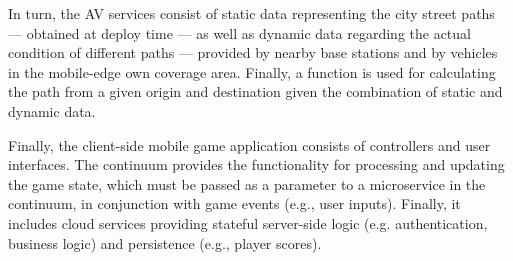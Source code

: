 In turn, the AV services consist of static data representing the city street paths --- obtained at deploy time --- as well as dynamic data regarding the actual condition of different paths --- provided by nearby base stations and by vehicles in the mobile-edge own coverage area. Finally, a function is used for calculating the path from a given origin and destination given the combination of static and dynamic data.
 
Finally, the client-side mobile game application consists of controllers and user interfaces. The continuum provides the functionality for processing and updating the game state, which must be passed as a parameter to a microservice in the continuum, in conjunction with game events (e.g., user inputs). Finally, it includes cloud services providing stateful server-side logic (e.g. authentication, business logic) and persistence (e.g., player scores). 









